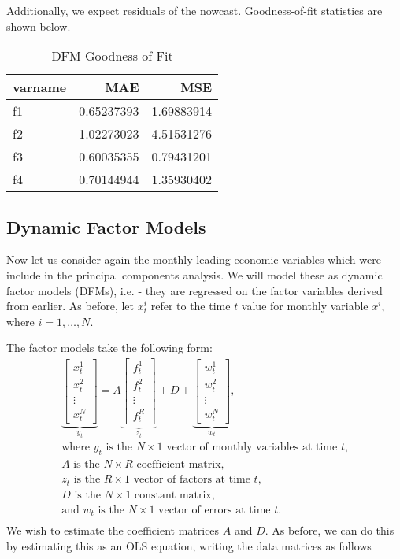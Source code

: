 \documentclass[11pt, letterpaper]{article}\usepackage[]{graphicx}\usepackage[]{color}
\begin{document}
Additionally, we expect residuals of the nowcast. Goodness-of-fit statistics are shown below.
\begin{table}[H]
\centering
\begingroup\footnotesize
\begin{tabular}{lrr}
  \hline
varname & MAE & MSE \\ 
  \hline
f1 & 0.65237393 & 1.69883914 \\ 
  f2 & 1.02273023 & 4.51531276 \\ 
  f3 & 0.60035355 & 0.79431201 \\ 
  f4 & 0.70144944 & 1.35930402 \\ 
   \hline
\end{tabular}
\endgroup
\caption{DFM Goodness of Fit} 
\end{table}




\subsection{Dynamic Factor Models}
Now let us consider again the monthly leading economic variables which were include in the principal components analysis. We will model these as dynamic factor models (DFMs), i.e. - they are regressed on the factor variables derived from earlier. As before, let $x^i_t$ refer to the time $t$ value for monthly variable $x^i$, where $i = 1, \dots, N$.

The factor models take the following form:
\begin{align*}
\underbrace{\begin{bmatrix}
	x^1_t\\
	x^2_t\\
	\vdots \\
	x^N_t
\end{bmatrix}}_{y_t}
=
A
\underbrace{\begin{bmatrix}
	f^1_{t}\\
	f^2_{t}\\
	\vdots \\
	f^R_{t}
\end{bmatrix}}_{z_t}
+
D 
+
\underbrace{\begin{bmatrix}
	w^1_t\\
	w^2_t\\
	\vdots\\
	w^N_t
\end{bmatrix}}_{w_t},\\
\text{where $y_t$ is the $N \times 1$ vector of monthly variables at time $t$,}\\
\text{$A$ is the $N \times R$ coefficient matrix,}\\
\text{$z_t$ is the $R \times 1$ vector of factors at time $t$,}\\
\text{$D$ is the $N \times 1$ constant matrix,}\\
\text{and $w_t$ is the $N \times 1$ vector of errors at time $t$.}\\
\end{align*}
We wish to estimate the coefficient matrices $A$ and $D$. As before, we can do this by estimating this as an OLS equation, writing the data matrices as follows
\end{document}

